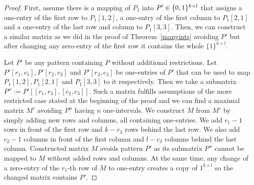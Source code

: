 \begin{proof}
First, assume there is a mapping of $P_1$ into $P'\in\{0,1\}^{k\times l}$ that assigns a one-entry of the first row to $P_1[1,2]$, a one-entry of the first column to $P_1[2,1]$ and a one-entry of the last row and column to $P_1[3,3]$. Then, we can construct a similar matrix as we did in the proof of Theorem~\ref{manyints} avoiding $P'$ but after changing any zero-entry of the first row it contains the whole $\{1\}^{k\times l}$.

Let $P'$ be any pattern containing $P$ without additional restrictions. Let $P'[r_1,c_1],P'[r_2,c_2]$ and $P'[r_3,c_3]$ be one-entries of $P'$ that can be used to map $P_1[1,2],P_1[2,1]$ and $P_1[3,3]$ to it respectively. Then we take a submatrix $P'':=P'[[r_1,r_3],[c_2,c_3]]$. Such a matrix fulfills assumptions of the more restricted case stated at the beginning of the proof and we can find a maximal matrix $M'$ avoiding $P''$ having $n$ one-intervals. We construct $M$ from $M'$ by simply adding new rows and columns, all containing one-entries. We add $r_1-1$ rows in front of the first row and $k-r_3$ rows behind the last row. We also add $c_2-1$ columns in front of the first column and $l-c_3$ columns behind the last column. Constructed matrix $M$ avoids pattern $P'$ as its submatrix $P''$ cannot be mapped to $M$ without added rows and columns. At the same time, any change of a zero-entry of the $r_1$-th row of $M$ to one-entry creates a copy of ${1}^{k\times l}$ so the changed matrix contains $P'$.
\end{proof}

